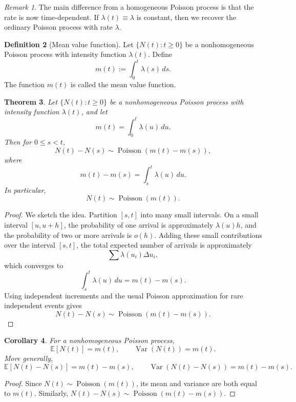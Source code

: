 \documentclass[11pt]{article}
\theoremstyle{plain}
\newtheorem{theorem}{Theorem}[section]
\newtheorem{corollary}[theorem]{Corollary}
\theoremstyle{definition}
\newtheorem{definition}[theorem]{Definition}
\theoremstyle{remark}
\newtheorem{remark}[theorem]{Remark}
\begin{document}
	\begin{remark}
		The main difference from a homogeneous Poisson process is that the rate is now time-dependent. If \(\lambda(t)\equiv \lambda\) is constant, then we recover the ordinary Poisson process with rate \(\lambda\).
	\end{remark}
	
	\begin{definition}[Mean value function]
		Let \(\{N(t):t\ge 0\}\) be a nonhomogeneous Poisson process with intensity function \(\lambda(t)\). Define
		\[
		m(t):=\int_0^t \lambda(s)\,ds.
		\]
		The function \(m(t)\) is called the mean value function.
	\end{definition}
	
	\begin{theorem}
		Let \(\{N(t):t\ge 0\}\) be a nonhomogeneous Poisson process with intensity function \(\lambda(t)\), and let
		\[
		m(t)=\int_0^t \lambda(u)\,du.
		\]
		Then for \(0\le s<t\),
		\[
		N(t)-N(s)\sim \operatorname{Poisson}(m(t)-m(s)),
		\]
		where
		\[
		m(t)-m(s)=\int_s^t \lambda(u)\,du.
		\]
		In particular,
		\[
		N(t)\sim \operatorname{Poisson}(m(t)).
		\]
	\end{theorem}
	
	\begin{proof}
		We sketch the idea. Partition \([s,t]\) into many small intervals. On a small interval \([u,u+h]\), the probability of one arrival is approximately \(\lambda(u)h\), and the probability of two or more arrivals is \(o(h)\). Adding these small contributions over the interval \([s,t]\), the total expected number of arrivals is approximately
		\[
		\sum \lambda(u_i)\Delta u_i,
		\]
		which converges to
		\[
		\int_s^t \lambda(u)\,du=m(t)-m(s).
		\]
		Using independent increments and the usual Poisson approximation for rare independent events gives
		\[
		N(t)-N(s)\sim \operatorname{Poisson}(m(t)-m(s)).
		\]
	\end{proof}
	
	\begin{corollary}
		For a nonhomogeneous Poisson process,
		\[
		\mathbb{E}[N(t)]=m(t),
		\qquad
		\operatorname{Var}(N(t))=m(t).
		\]
		More generally,
		\[
		\mathbb{E}[N(t)-N(s)]=m(t)-m(s),
		\qquad
		\operatorname{Var}(N(t)-N(s))=m(t)-m(s).
		\]
	\end{corollary}
	
	\begin{proof}
		Since \(N(t)\sim \operatorname{Poisson}(m(t))\), its mean and variance are both equal to \(m(t)\). Similarly, \(N(t)-N(s)\sim \operatorname{Poisson}(m(t)-m(s))\).
	\end{proof}
	
\end{document}
